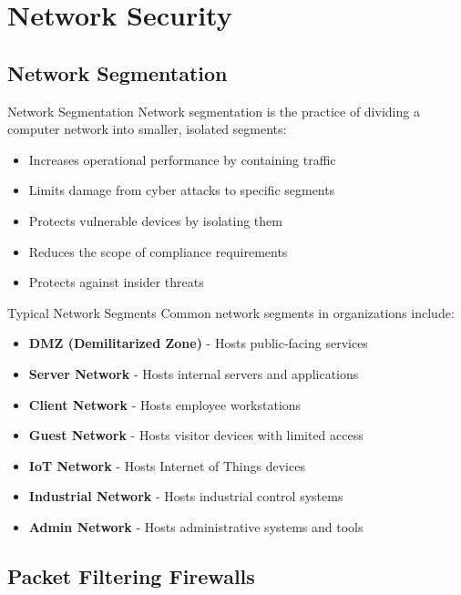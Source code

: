 \section{Network Security}

\subsection{Network Segmentation}

\begin{definition}{Network Segmentation}
Network segmentation is the practice of dividing a computer network into smaller, isolated segments:
\begin{itemize}
    \item Increases operational performance by containing traffic
    \item Limits damage from cyber attacks to specific segments
    \item Protects vulnerable devices by isolating them
    \item Reduces the scope of compliance requirements
    \item Protects against insider threats
\end{itemize}
\end{definition}

\begin{concept}{Typical Network Segments}
Common network segments in organizations include:
\begin{itemize}
    \item \textbf{DMZ (Demilitarized Zone)} - Hosts public-facing services
    \item \textbf{Server Network} - Hosts internal servers and applications
    \item \textbf{Client Network} - Hosts employee workstations
    \item \textbf{Guest Network} - Hosts visitor devices with limited access
    \item \textbf{IoT Network} - Hosts Internet of Things devices
    \item \textbf{Industrial Network} - Hosts industrial control systems
    \item \textbf{Admin Network} - Hosts administrative systems and tools
\end{itemize}
\end{concept}

\subsection{Packet Filtering Firewalls}

